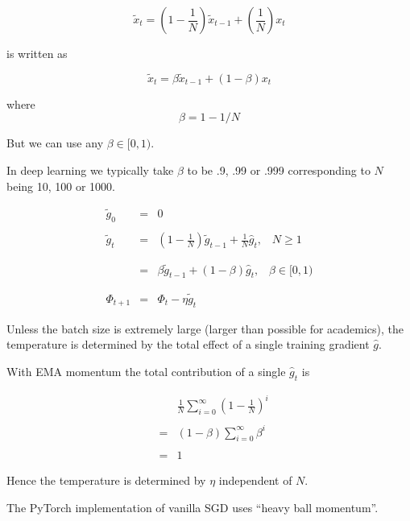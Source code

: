 {

$$\tilde{x}_t = \left(1-\frac{1}{N}\right)\tilde{x}_{t-1} + \left(\frac{1}{N}\right)x_t$$

\vfill
is written as

$$\tilde{x}_t = \beta\tilde{x}_{t-1} + (1-\beta)x_t$$

\vfill
where
$$\beta = 1 - 1/N$$

\vfill
But we can use any $\beta \in [0,1)$.

\vfill
In deep learning we typically take $\beta$ to be .9, .99 or .999 corresponding to $N$ being 10, 100 or 1000.


\begin{eqnarray*}
  \tilde{g}_0 & = & 0 \\
  \\
  \tilde{g}_{t} & = & \left(1-\frac{1}{N}\right)\tilde{g}_{t-1} + \frac{1}{N} \hat{g}_t,\;\;\;N \geq 1 \\
  \\
  \\
  & = & \beta \tilde{g}_{t-1} + (1-\beta)\hat{g}_t,\;\;\;\beta \in [0,1) \\
  \\             
  \\
  \Phi_{t+1} & =  & \Phi_t - \eta\tilde{g}_{t}
\end{eqnarray*}


Unless the batch size is extremely large (larger than possible for academics),
the temperature is determined by the total effect of a single training gradient $\hat{g}$.

\vfill
With EMA momentum the total contribution of a single $\hat{g}_t$ is

{\huge
\begin{eqnarray*}
& & \frac{1}{N} \sum_{i = 0}^\infty \left(1 - \frac{1}{N}\right)^i \\
\\
& = & (1-\beta)  \sum_{i = 0}^\infty \beta^i \\
\\
& = & 1
\end{eqnarray*}
}

\vfill
Hence the temperature is determined by $\eta$ independent of $N$.


The PyTorch implementation of vanilla SGD uses ``heavy ball momentum''.

}
